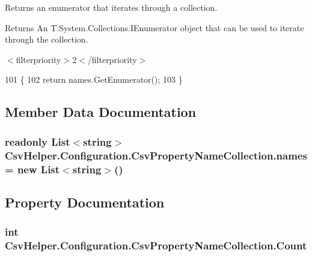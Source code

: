 Returns an enumerator that iterates through a collection. 

\begin{DoxyReturn}{Returns}
An T\-:\-System.\-Collections.\-I\-Enumerator object that can be used to iterate through the collection. 
\end{DoxyReturn}
$<$filterpriority$>$2$<$/filterpriority$>$ 
\begin{DoxyCode}
101         \{
102             \textcolor{keywordflow}{return} names.GetEnumerator();
103         \}
\end{DoxyCode}


\subsection{Member Data Documentation}
\hypertarget{a00054_a41eb6804d8afe8d674e64d71f66962ce}{
\subsubsection[{names}]{\setlength{\rightskip}{0pt plus 5cm}readonly List$<$string$>$ Csv\-Helper.\-Configuration.\-Csv\-Property\-Name\-Collection.\-names = new List$<$string$>$()\hspace{0.3cm}{\ttfamily [private]}}}\label{a00054_a41eb6804d8afe8d674e64d71f66962ce}


\subsection{Property Documentation}
\hypertarget{a00054_a4b7b56286ad80183e1a33554a49eefa1}{
\subsubsection[{Count}]{\setlength{\rightskip}{0pt plus 5cm}int Csv\-Helper.\-Configuration.\-Csv\-Property\-Name\-Collection.\-Count\hspace{0.3cm}{\ttfamily [get]}}}\label{a00054_a4b7b56286ad80183e1a33554a49eefa1}



